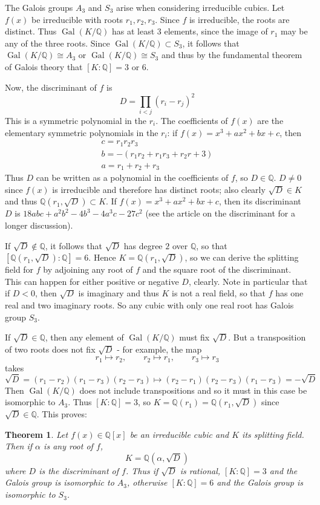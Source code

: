 \documentclass[12pt]{article}
\newcommand{\Rats}{\mathbb{Q}}
\newtheorem{thm}{Theorem}
\DeclareMathOperator{\Gal}{Gal}
\begin{document}
The Galois groups $A_3$ and $S_3$ arise when considering irreducible cubics. Let $f(x)$ be irreducible with roots $r_1, r_2, r_3$. Since $f$ is irreducible, the roots are distinct. Thus $\Gal(K/\Rats)$ has at least $3$ elements, since the image of $r_1$ may be any of the three roots. Since $\Gal(K/\Rats)\subset S_3$, it follows that $\Gal(K/\Rats)\cong A_3$ or $\Gal(K/\Rats)\cong S_3$ and thus by the fundamental theorem of Galois theory that $[K:\Rats]=3$ or $6$.

Now, the discriminant of $f$ is
\[D=\prod_{i<j} (r_i-r_j)^2\]
This is a symmetric polynomial in the $r_i$. The coefficients of $f(x)$ are the elementary symmetric polynomials in the $r_i$: if $f(x)=x^3+ax^2+bx+c$, then
\begin{gather*}
c=r_1r_2r_3\\
b=-(r_1r_2+r_1r_3+r_2r+3)\\
a=r_1+r_2+r_3
\end{gather*}
Thus $D$ can be written as a polynomial in the coefficients of $f$, so $D\in\Rats$. $D\neq 0$ since $f(x)$ is irreducible and therefore has distinct roots; also clearly $\sqrt{D}\in K$ and thus $\Rats(r_1,\sqrt{D})\subset K$. If $f(x)=x^3+ax^2+bx+c$, then its discriminant $D$ is $18abc + a^2 b^2 - 4b^3 - 4a^3 c - 27 c^2$ (see the article on the discriminant for a longer discussion).

If $\sqrt{D}\notin\Rats$, it follows that $\sqrt{D}$ has degree $2$ over $\Rats$, so that $[\Rats(r_1,\sqrt{D}):\Rats]=6$. Hence $K=\Rats(r_1,\sqrt{D})$, so we can derive the splitting field for $f$ by adjoining any root of $f$ and the square root of the discriminant. This can happen for either positive or negative $D$, clearly. 
Note in particular that if $D<0$, then $\sqrt{D}$ is imaginary and thus $K$ is not a real field, so that $f$ has one real and two imaginary roots. So any cubic with only one real root has Galois group $S_3$.

If $\sqrt{D}\in\Rats$, then any element of $\Gal(K/\Rats)$ must fix $\sqrt{D}$. But a transposition of two roots does not fix $\sqrt{D}$ - for example, the map
\[r_1\mapsto r_2, \qquad r_2\mapsto r_1, \qquad r_3\mapsto r_3\]
takes 
\[\sqrt{D}=(r_1-r_2)(r_1-r_3)(r_2-r_3)\mapsto (r_2-r_1)(r_2-r_3)(r_1-r_3)=-\sqrt{D}\]
Then $\Gal(K/\Rats)$ does not include transpositions and so it must in this case be isomorphic to $A_3$. Thus $[K:\Rats]=3$, so $K=\Rats(r_1)=\Rats(r_1,\sqrt{D})$ since $\sqrt{D}\in\Rats$. This proves:

\begin{thm} Let $f(x)\in\Rats[x]$ be an irreducible cubic and $K$ its splitting field. Then if $\alpha$ is any root of $f$,
\[K=\Rats(\alpha,\sqrt{D})\]
where $D$ is the discriminant of $f$. Thus if $\sqrt{D}$ is rational, $[K:\Rats]=3$ and the Galois group is isomorphic to $A_3$, otherwise $[K:\Rats]=6$ and the Galois group is isomorphic to $S_3$.
\end{thm}
\end{document}
